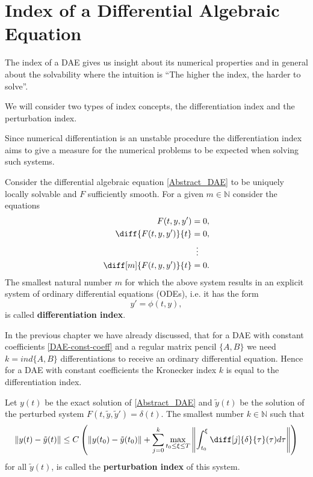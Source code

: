 \section{Index of a Differential Algebraic Equation}

The index of a DAE gives us insight about its numerical properties and in general about the solvability where the intuition is ``The higher the index, the harder to solve''.

We will consider two types of index concepts, the differentiation index and the perturbation index.

Since numerical differentiation is an unstable procedure the differentiation index aims to give a measure for the numerical problems to be expected when solving such systems.

\begin{definition}
	Consider the differential algebraic equation \eqref{Abstract_DAE} to be uniquely locally solvable and $F$ sufficiently smooth. For a given $m \in \mathbb{N}$ consider the equations
	\begin{displaymath}
		\begin{aligned}
			F(t,y,y') &= 0, \\
			\diff{F(t,y,y')}{t} &= 0, \\
			&\vdotswithin{=} \\
			\diff[m]{F(t,y,y')}{t} &= 0.
		\end{aligned}
	\end{displaymath}
	The smallest natural number $m$ for which the above system results in an explicit system of ordinary differential equations (ODEs), i.e. it has the form
	\begin{displaymath}
		y' = \phi(t,y),
	\end{displaymath}
	is called \textbf{differentiation index}.
\end{definition}

In the previous chapter we have already discussed, that for a DAE with constant coefficients \eqref{DAE-const-coeff} and a regular matrix pencil $\{A,B\}$  we need $k = ind\{A,B\}$ differentiations to receive an ordinary differential equation. Hence for a DAE with constant coefficients the Kronecker index $k$ is equal to the differentiation index.

\begin{definition}
	Let $y(t)$ be the exact solution of \eqref{Abstract_DAE} and $\tilde{y}(t)$ be the solution of the perturbed system $F(t, \tilde{y}, \tilde{y}') = \delta(t)$. The smallest number $k \in \mathbb{N}$ such that 
	\begin{displaymath}
		\|y(t)-\tilde{y}(t)\| \leq C \left(\|y(t_0)-\tilde{y}(t_0)\|+\sum_{j=0}^{k}\max_{t_0 \leq \xi \leq T} \left\rVert 		\int_{t_0}^{\xi}\diff[j]{\delta}{\tau}(\tau)d \tau \right\rVert \right)
	\end{displaymath}
	for all $\tilde{y}(t)$, is called the \textbf{perturbation index} of this system.
\end{definition}	

